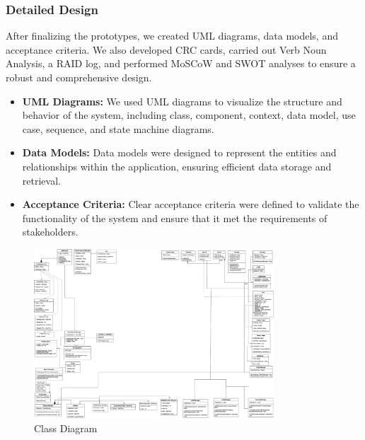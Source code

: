 \subsubsection{Detailed Design}
After finalizing the prototypes, we created UML diagrams, data models, and acceptance criteria. We also developed CRC cards, carried out Verb Noun Analysis, a RAID log, and performed MoSCoW and SWOT analyses to ensure a robust and comprehensive design.

\begin{itemize}
  \item \textbf{UML Diagrams:} We used UML diagrams to visualize the structure and behavior of the system, including class, component, context, data model, use case, sequence, and state machine diagrams.
  
  \item \textbf{Data Models:} Data models were designed to represent the entities and relationships within the application, ensuring efficient data storage and retrieval.
  
  \item \textbf{Acceptance Criteria:} Clear acceptance criteria were defined to validate the functionality of the system and ensure that it met the requirements of stakeholders.
\end{itemize}

\begin{figure}[H]
    \centering
    \includegraphics[width=0.8\textwidth]{images/class_diagram.png}
    \caption{Class Diagram}
    \label{fig:example_iclassimage}
  \end{figure}


